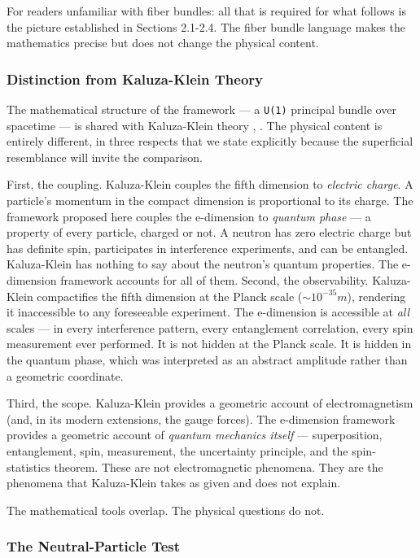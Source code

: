 \documentclass[aps,prd,preprint,superscriptaddress,longbibliography,floatfix]{revtex4-2}
\theoremstyle{remark}
\begin{document}
For readers unfamiliar with fiber bundles: all that is required for what follows is the picture established in Sections 2.1-2.4. The fiber bundle language makes the mathematics precise but does not change the physical content.


\subsubsection{Distinction from Kaluza-Klein Theory}

The mathematical structure of the framework --- a \texttt{U(1)} principal bundle over spacetime --- is shared with Kaluza-Klein theory \cite{Kaluza1921}, \cite{Klein1926}. The physical content is entirely different, in three respects that we state explicitly because the superficial resemblance will invite the comparison.

First, the coupling. Kaluza-Klein couples the fifth dimension to \textit{electric charge}. A particle's momentum in the compact dimension is proportional to its charge. The framework proposed here couples the e-dimension to \textit{quantum phase} --- a property of every particle, charged or not. A neutron has zero electric charge but has definite spin, participates in interference experiments, and can be entangled. Kaluza-Klein has nothing to say about the neutron's quantum properties. The e-dimension framework accounts for all of them.
Second, the observability. Kaluza-Klein compactifies the fifth dimension at the Planck scale ($\sim 10^{-35} m$), rendering it inaccessible to any foreseeable experiment. The e-dimension is accessible at \textit{all} scales --- in every interference pattern, every entanglement correlation, every spin measurement ever performed. It is not hidden at the Planck scale. It is hidden in the quantum phase, which was interpreted as an abstract amplitude rather than a geometric coordinate.

Third, the scope. Kaluza-Klein provides a geometric account of electromagnetism (and, in its modern extensions, the gauge forces). The e-dimension framework provides a geometric account of \textit{quantum mechanics itself} --- superposition, entanglement, spin, measurement, the uncertainty principle, and the spin-statistics theorem. These are not electromagnetic phenomena. They are the phenomena that Kaluza-Klein takes as given and does not explain.

The mathematical tools overlap. The physical questions do not.


\subsubsection{The Neutral-Particle Test}
\end{document}
